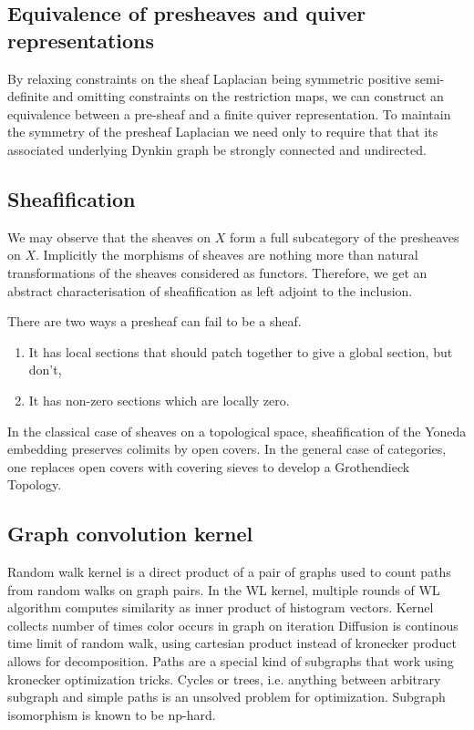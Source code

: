 \documentclass{article}
\theoremstyle{definition}
\begin{document}
\subsection{Equivalence of presheaves and quiver representations}
\label{sec:sheaf-quiver-equiv}

By relaxing constraints on the sheaf Laplacian being symmetric positive semi-definite and omitting constraints on the restriction maps, we can construct an equivalence between a pre-sheaf and a finite quiver representation. To maintain the symmetry of the presheaf Laplacian we need only to require that that its associated underlying Dynkin graph be strongly connected and undirected. 

\subsection{Sheafification}
\label{sec:sheafification}

We may observe that the sheaves on $X$ form a full subcategory of the presheaves on $X$. Implicitly the morphisms of sheaves are nothing more than natural transformations of the sheaves considered as functors. Therefore, we get an abstract characterisation of sheafification as left adjoint to the inclusion.

There are two ways a presheaf can fail to be a sheaf.
\begin{enumerate}
    \item It has local sections that should patch together to give a global section, but don't,
    \item It has non-zero sections which are locally zero.
\end{enumerate}
    
In the classical case of sheaves on a topological space, sheafification of the Yoneda embedding preserves colimits by open covers. In the general case of categories, one replaces open covers with covering sieves to develop a Grothendieck Topology.

\subsection{Graph convolution kernel}
\label{sec:graph-kernel}

Random walk kernel is a direct product of a pair of graphs used to count paths from random walks on graph pairs.
In the WL kernel, multiple rounds of WL algorithm computes similarity as inner product of histogram vectors. Kernel collects number of times color occurs in graph on iteration
Diffusion is continous time limit of random walk, using cartesian product instead of kronecker product allows for decomposition.
Paths are a special kind of subgraphs that work using kronecker optimization tricks.
Cycles or trees, i.e. anything between arbitrary subgraph and simple paths is an unsolved problem for optimization.
Subgraph isomorphism is known to be np-hard.
\end{document}
